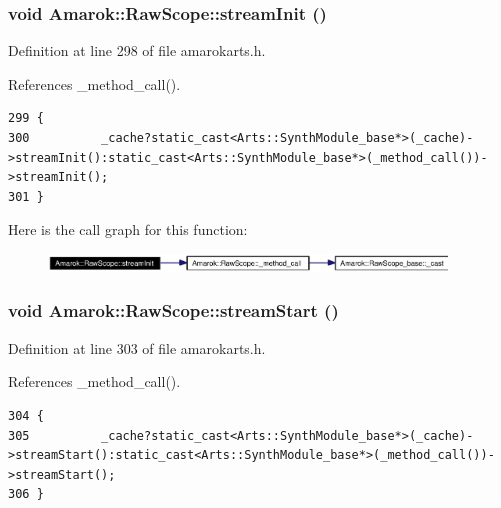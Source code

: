 \subsubsection{\setlength{\rightskip}{0pt plus 5cm}void Amarok::Raw\-Scope::stream\-Init ()\hspace{0.3cm}{\tt  [inline]}}\label{classAmarok_1_1RawScope_Amarok_1_1RawScopea13}




Definition at line 298 of file amarokarts.h.

References \_\-method\_\-call().



\footnotesize\begin{verbatim}299 {
300          _cache?static_cast<Arts::SynthModule_base*>(_cache)->streamInit():static_cast<Arts::SynthModule_base*>(_method_call())->streamInit();
301 }
\end{verbatim}\normalsize 


Here is the call graph for this function:\begin{figure}[H]
\begin{center}
\leavevmode
\includegraphics[width=300pt]{classAmarok_1_1RawScope_Amarok_1_1RawScopea13_cgraph}
\end{center}
\end{figure}
\subsubsection{\setlength{\rightskip}{0pt plus 5cm}void Amarok::Raw\-Scope::stream\-Start ()\hspace{0.3cm}{\tt  [inline]}}\label{classAmarok_1_1RawScope_Amarok_1_1RawScopea14}




Definition at line 303 of file amarokarts.h.

References \_\-method\_\-call().



\footnotesize\begin{verbatim}304 {
305          _cache?static_cast<Arts::SynthModule_base*>(_cache)->streamStart():static_cast<Arts::SynthModule_base*>(_method_call())->streamStart();
306 }
\end{verbatim}\normalsize 


